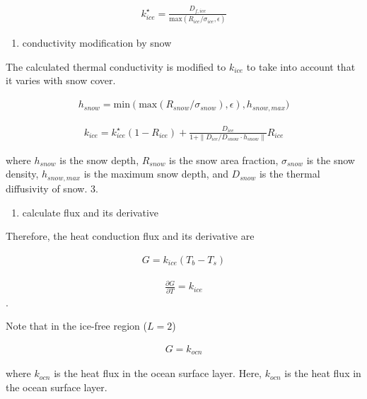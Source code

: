 \begin{eqnarray}
k_{ice}^\star = \frac{D_{f,ice}}{\mathrm{max}(R_{ice}/\sigma_{ice}, \epsilon)}
\end{eqnarray}

\begin{enumerate}
\def\labelenumi{\arabic{enumi}.}
\setcounter{enumi}{1}
\tightlist
\item
  conductivity modification by snow
\end{enumerate}

The calculated thermal conductivity is modified to \(k_{ice}\) to take
into account that it varies with snow cover.

\begin{eqnarray}
h_{snow} = \mathrm{min}(
    \mathrm{max}(
    R_{snow}/\sigma_{snow}),\epsilon
        ),h_{snow,max}
        )
\end{eqnarray}

\begin{eqnarray}      
k_{ice} = k_{ice}^\star (1-R_{ice}) + \frac{D_{ice}}{1+\| D_{ice}/D_{snow} \cdot h_{snow} \|} R_{ice}
\end{eqnarray}

where \(h_{snow}\) is the snow depth, \(R_{snow}\) is the snow area
fraction, \(\sigma_{snow}\) is the snow density, \(h_{snow,max}\) is the
maximum snow depth, and \(D_{snow}\) is the thermal diffusivity of snow.
3.

\begin{enumerate}
\def\labelenumi{\arabic{enumi}.}
\setcounter{enumi}{2}
\tightlist
\item
  calculate flux and its derivative
\end{enumerate}

Therefore, the heat conduction flux and its derivative are

\begin{eqnarray}
 G = k_{ice} (T_b - T_s)
\end{eqnarray}

\begin{eqnarray}
 \frac{\partial G}{\partial T} = k_{ice}
\end{eqnarray}.

Note that in the ice-free region (\(L=2\))

\begin{eqnarray}
G=k_{ocn}
\end{eqnarray}

where \(k_{ocn}\) is the heat flux in the ocean surface layer. Here,
\(k_{ocn}\) is the heat flux in the ocean surface layer.

